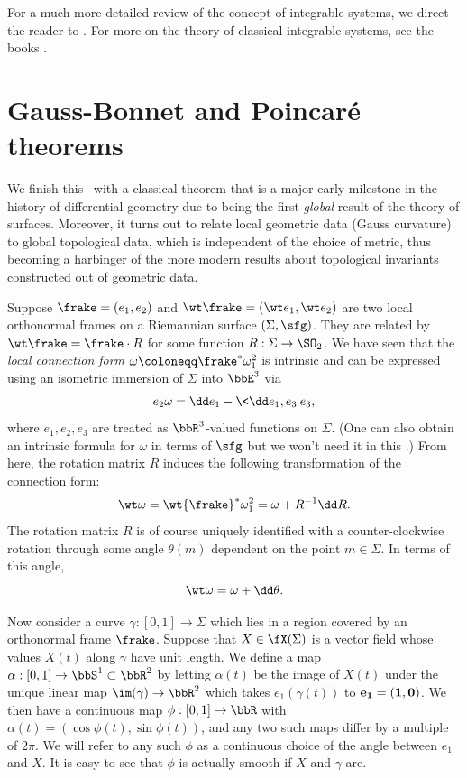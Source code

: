 For a much more detailed review of the concept of integrable systems, we direct the reader to \cite{deift}. For more on the theory of classical integrable systems, see the books \cite{moser,babelon}.





\section{Gauss-Bonnet and Poincar\'e theorems}\label{sec: gauss-bonnet}

We finish this \chap\ with a classical theorem that is a major early milestone in the history of differential geometry due to being the first \emph{global} result of the theory of surfaces. Moreover, it turns out to relate local geometric data (Gauss curvature) to global topological data, which is independent of the choice of metric, thus becoming a harbinger of the more modern results about topological invariants constructed out of geometric data.


Suppose $\frake=(e_1,e_2)$ and $\wt\frake=(\wt e_1,\wt e_2)$ are two local orthonormal frames on a Riemannian surface $(\Sigma,\sfg)$. They are related by $\wt\frake=\frake\cdot R$ for some function $R:\Sigma\to \SO_2$. We have seen that the \emph{local connection form} $\omega\coloneqq\frake^\ast\omega^2_1$ is intrinsic and can be expressed using an isometric immersion of $\Sigma$ into $\bbE^3$ via 
\[e_2\omega=\dd e_1-\<\dd e_1,e_3\>e_3,\] 
where $e_1,e_2,e_3$ are treated as $\bbR^3$-valued functions on $\Sigma$. (One can also obtain an intrinsic formula for $\omega$ in terms of $\sfg$ but we won't need it in this \chap.) From here, the rotation matrix $R$ induces the following transformation of the connection form:
\[\wt\omega =\wt{\frake}^\ast\omega^2_1=\omega+R^{-1}\dd R.\]
The rotation matrix $R$ is of course uniquely identified with a counter-clockwise rotation through some angle $\theta(m)$ dependent on the point $m\in \Sigma$. In terms of this angle, 
\[\wt\omega =\omega+\dd\theta.\label{eq 169}\]

Now consider a curve $\gamma:[0,1]\to \Sigma$ which lies in a region covered by an orthonormal frame $\frake$. Suppose that $X\in\fX(\Sigma)$ is a vector field whose values $X(t)$ along $\gamma$ have unit length. We define a map $\alpha:[0,1]\to \bbS^1\subset \bbR^2$ by letting $\alpha(t)$ be the image of $X(t)$ under the unique linear map $\im(\gamma)\to \bbR^2$ which takes $e_1(\gamma(t))$ to $\bf{e}_1=(1,0)$. We then have a continuous map $\phi:[0,1]\to \bbR$ with $\alpha(t)=(\cos\phi(t),\sin\phi(t))$, and any two such maps differ by a multiple of $2\pi$. We will refer to any such $\phi$ as a continuous choice of the angle between $e_1$ and $X$. It is easy to see that $\phi$ is actually smooth if $X$ and $\gamma$ are. 

